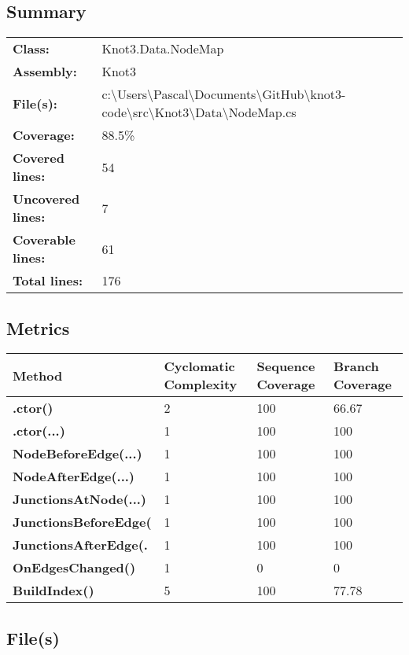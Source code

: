 \documentclass[a4paper,10pt]{article}
\begin{document}
\subsection{Summary}
\begin{longtable}[l]{ll}
\textbf{Class:} & Knot3.Data.NodeMap\\
\textbf{Assembly:} & Knot3\\
\textbf{File(s):} & \begin{minipage}[t]{12cm}{c:\textbackslash Users\textbackslash Pascal\textbackslash Documents\textbackslash GitHub\textbackslash knot3-code\textbackslash src\textbackslash Knot3\textbackslash Data\textbackslash NodeMap.cs}\end{minipage} \\
\textbf{Coverage:} & 88.5\%\\
\textbf{Covered lines:} & 54\\
\textbf{Uncovered lines:} & 7\\
\textbf{Coverable lines:} & 61\\
\textbf{Total lines:} & 176\\
\end{longtable}
\subsection{Metrics}
\begin{longtable}[l]{|l|l|l|l|}
\hline
\textbf{Method} & \textbf{Cyclomatic Complexity} & \textbf{Sequence Coverage} & \textbf{Branch Coverage}\\
\hline
\textbf{.ctor()} & 2 & 100 & 66.67\\
\hline
\textbf{.ctor(...)} & 1 & 100 & 100\\
\hline
\textbf{NodeBeforeEdge(...)} & 1 & 100 & 100\\
\hline
\textbf{NodeAfterEdge(...)} & 1 & 100 & 100\\
\hline
\textbf{JunctionsAtNode(...)} & 1 & 100 & 100\\
\hline
\textbf{JunctionsBeforeEdge(} & 1 & 100 & 100\\
\hline
\textbf{JunctionsAfterEdge(.} & 1 & 100 & 100\\
\hline
\textbf{OnEdgesChanged()} & 1 & 0 & 0\\
\hline
\textbf{BuildIndex()} & 5 & 100 & 77.78\\
\hline
\end{longtable}
\subsection{File(s)}
\end{document}
